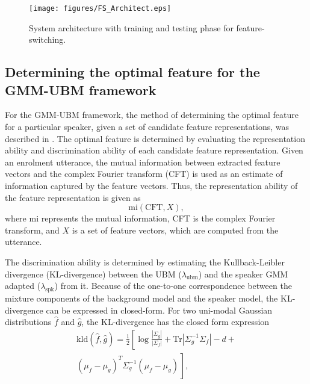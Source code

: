 \documentclass{article}
\begin{document}
\begin{figure}[th]
\centering
\texttt{[image: figures/FS\_Architect.eps]}
\caption{System architecture with training and testing phase for feature-switching.}
\label{fig:systemArch}
\end{figure}



\subsection{Determining the optimal feature for the GMM-UBM framework}
\label{subsec:ubm_optFeat}

For the GMM-UBM framework, the method of determining the optimal feature for a
particular speaker, given a set of candidate feature representations, was
described in \cite{padmanInterspeech2010}. The optimal feature is determined by
evaluating the representation ability and discrimination ability
of each candidate feature representation. Given an enrolment utterance, the
mutual information between extracted feature vectors and the complex Fourier
transform (CFT) is used as an estimate of information captured by the feature
vectors. Thus, the representation ability of the feature representation is given
as 
\begin{equation}
\textrm{mi}(\textrm{CFT},X),
\end{equation}
where $\textrm{mi}$ represents the mutual information, CFT is the complex
Fourier transform, and $X$ is a set of feature vectors, which are computed from
the utterance.


The discrimination ability is determined by estimating the Kullback-Leibler divergence
(KL-divergence) between the UBM ($\lambda_{\textrm{ubm}}$) and the speaker GMM adapted 
($\lambda_{\textrm{spk}}$) from it. Because of the one-to-one
correspondence between the mixture components of the background model and the speaker model, 
the KL-divergence can be expressed in closed-form. For two uni-modal Gaussian distributions
$\hat{f}$ and $\hat{g}$, the KL-divergence has the closed form expression
\begin{equation}
\begin{split}
\textrm{kld}(\hat{f},\hat{g}) = \frac{1}{2}\left[ \log \frac{|\Sigma_g|}{|\Sigma_f|} +
	\textrm{Tr}|\Sigma^{-1}_g\Sigma_f| - d + \right. \\ 
\left. (\mu_f-\mu_g)^T\Sigma_g^{-1}(\mu_f-\mu_g) \frac{}{} \right], 
\end{split}
\label{eq:kldGaussians}
\end{equation}
\end{document}
